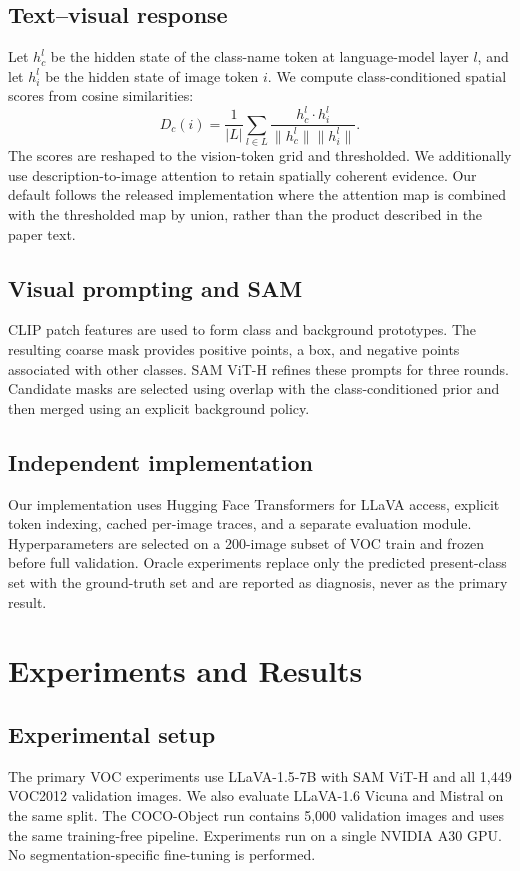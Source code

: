 \documentclass{article}
\begin{document}
\subsection{Text--visual response}
Let $h_c^l$ be the hidden state of the class-name token at language-model layer $l$, and let
$h_{i}^{l}$ be the hidden state of image token $i$. We compute class-conditioned spatial scores
from cosine similarities:
\[
D_c(i)=\frac{1}{|L|}\sum_{l\in L}
\frac{h_c^l\cdot h_i^l}{\|h_c^l\|\|h_i^l\|}.
\]
The scores are reshaped to the vision-token grid and thresholded. We additionally use
description-to-image attention to retain spatially coherent evidence. Our default follows the
released implementation where the attention map is combined with the thresholded map by union,
rather than the product described in the paper text.

\subsection{Visual prompting and SAM}
CLIP patch features are used to form class and background prototypes. The resulting coarse mask
provides positive points, a box, and negative points associated with other classes. SAM ViT-H
refines these prompts for three rounds. Candidate masks are selected using overlap with the
class-conditioned prior and then merged using an explicit background policy.

\subsection{Independent implementation}
Our implementation uses Hugging Face Transformers for LLaVA access, explicit token indexing,
cached per-image traces, and a separate evaluation module. Hyperparameters are selected on a
200-image subset of VOC train and frozen before full validation. Oracle experiments replace only
the predicted present-class set with the ground-truth set and are reported as diagnosis, never as
the primary result.

\section{Experiments and Results}
\label{sec:experiments}
\subsection{Experimental setup}
The primary VOC experiments use LLaVA-1.5-7B with SAM ViT-H and all 1,449 VOC2012 validation
images. We also evaluate LLaVA-1.6 Vicuna and Mistral on the same split. The COCO-Object run
contains 5,000 validation images and uses the same training-free pipeline. Experiments run on a
single NVIDIA A30 GPU. No segmentation-specific fine-tuning is performed.
\end{document}
